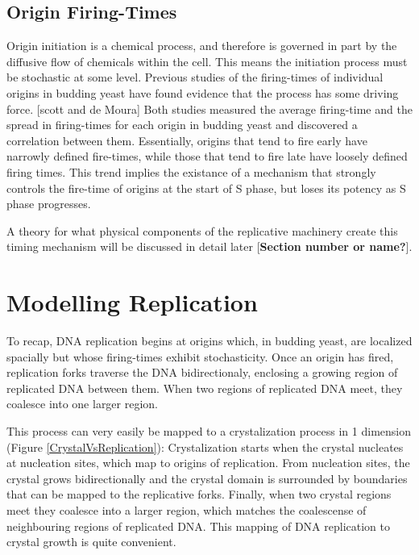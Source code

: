 		\subsection{Origin Firing-Times}
		
		Origin initiation is a chemical process, and therefore is governed in part by the diffusive flow of chemicals within the cell.
		This means the initiation process must be stochastic at some level.
		Previous studies of the firing-times of individual origins in budding yeast have found evidence that the process has some driving force. [scott and de Moura]
		Both studies measured the average firing-time and the spread in firing-times for each origin in budding yeast and discovered a correlation between them.
		Essentially, origins that tend to fire early have narrowly defined fire-times, while those that tend to fire late have loosely defined firing times.
		This trend implies the existance of a mechanism that strongly controls the fire-time of origins at the start of S phase, but loses its potency as S phase progresses.
		
		A theory for what physical components of the replicative machinery create this timing mechanism will be discussed in detail later [\textbf{Section number or name?}].
		
		
	\section{Modelling Replication}
	
	To recap, DNA replication begins at origins which, in budding yeast, are localized spacially but whose firing-times exhibit stochasticity.
	Once an origin has fired, replication forks traverse the DNA bidirectionaly, enclosing a growing region of replicated DNA between them.
	When two regions of replicated DNA meet, they coalesce into one larger region.
	
	This process can very easily be mapped to a crystalization process in 1 dimension (Figure \ref{CrystalVsReplication}):
	Crystalization starts when the crystal nucleates at nucleation sites, which map to origins of replication.
	From nucleation sites, the crystal grows bidirectionally and the crystal domain is surrounded by boundaries that can be mapped to the replicative forks.
	Finally, when two crystal regions meet they coalesce into a larger region, which matches the coalescense of neighbouring regions of replicated DNA.
	This mapping of DNA replication to crystal growth is quite convenient.
	
